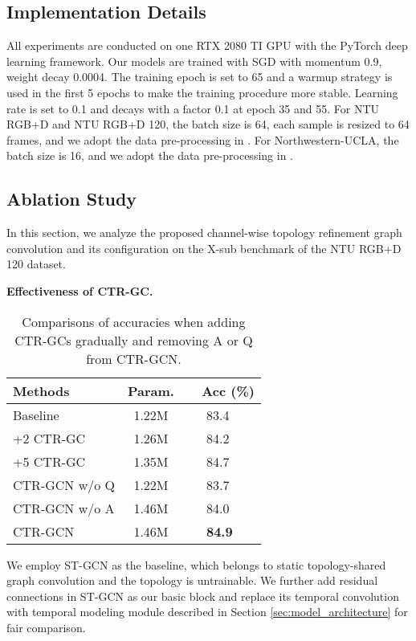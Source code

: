 \documentclass[10pt,twocolumn,letterpaper]{article}
\begin{document}
\subsection{Implementation Details}
All experiments are conducted on one RTX 2080 TI GPU with the PyTorch deep learning framework. Our models are trained with SGD with momentum 0.9, weight decay 0.0004. The training epoch is set to 65 and a warmup strategy \cite{he2016deep} is used in the first 5 epochs to make the training procedure more stable. Learning rate is set to 0.1 and decays with a factor 0.1 at epoch 35 and 55. For NTU RGB+D and NTU RGB+D 120, the batch size is 64, each sample is resized to 64 frames, and we adopt the data pre-processing in \cite{zhang2020semantics}. For Northwestern-UCLA, the batch size is 16, and we adopt the data pre-processing in \cite{cheng2020skeleton}.

\subsection{Ablation Study}
In this section, we analyze the proposed channel-wise topology refinement graph convolution and its configuration on the X-sub benchmark of the NTU RGB+D 120 dataset.

\noindent \textbf{Effectiveness of CTR-GC.}
\begin{table}
	\begin{center}
		\begin{tabular}{l c l}
			\hline
			\textbf{Methods} & \textbf{Param.} & \ \ \textbf{Acc (\%)} \\
			\hline\hline
			Baseline & 1.22M & \ \ \  83.4 \\
			\hline
			+2 CTR-GC & 1.26M & \ \ \ 84.2 \\
			+5 CTR-GC & 1.35M & \ \ \ 84.7 \\
			\hline
			CTR-GCN w/o Q & 1.22M & \ \ \ 83.7  \\
			CTR-GCN w/o A & 1.46M & \ \ \ 84.0 \\
			\hline
			CTR-GCN & 1.46M & \ \ \ \textbf{84.9 } \\
			\hline
		\end{tabular}
	\end{center}
	\vspace{-0.2cm}
	\caption{Comparisons of accuracies when adding CTR-GCs gradually and removing A or Q from CTR-GCN.}
	\vspace{-0.3cm}
	\label{tab:pagc_acc}
\end{table}
We employ ST-GCN \cite{yan2018spatial} as the baseline, which belongs to static topology-shared graph convolution and the topology is untrainable. We further add residual connections in ST-GCN as our basic block and replace its temporal convolution with temporal modeling module described in Section \ref{sec:model_architecture} for fair comparison.
\end{document}
